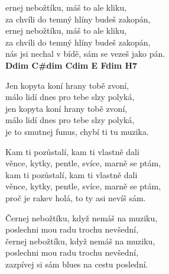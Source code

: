 
\ve
{}ernej nebožtíku, máš to ale kliku,\\
za chvíli do temný hlíny budeš zakopán,\\
ernej nebožtíku, máš to ale kliku,\\
za chvíli do temný hlíny budeš zakopán,\\
nás jsi nechal v bídě, sám se vezeš jako pán. \\
\textbf{{\footnotesize Ddim C\#dim Cdim E Fdim H7}}

\ve
Jen kopyta koní hrany tobě zvoní,\\
málo lidí dnes pro tebe slzy polyká,\\
jen kopyta koní hrany tobě zvoní,\\
málo lidí dnes pro tebe slzy polyká,\\
je to smutnej funus, chybí ti tu muzika.

\ve
Kam ti pozůstalí, kam ti vlastně dali\\
věnce, kytky, pentle, svíce, marně se ptám,\\
kam ti pozůstalí, kam ti vlastně dali\\
věnce, kytky, pentle, svíce, marně se ptám,\\
proč je rakev holá, to ty asi nevíš sám.

\ve
Černej nebožtíku, když nemáš na muziku,\\
poslechni mou radu trochu nevšední,\\
černej nebožtíku, když nemáš na muziku,\\
poslechni mou radu trochu nevšední,\\
zazpívej si sám blues na cestu poslední.

\esong